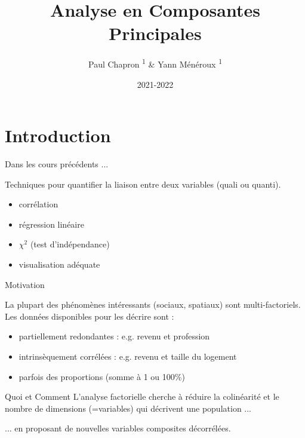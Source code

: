 \documentclass{beamer}
\title{Analyse en Composantes Principales}
\subtitle{}
\date{2021-2022}
\author{Paul Chapron \textsuperscript{1} \& Yann Ménéroux \textsuperscript{1}}
\institute{ \textsuperscript{1}IGN-ENSG-UGE}
\begin{document}
\maketitle	

\section{Introduction} 

\begin{frame}{Dans les cours précédents ... }


Techniques pour quantifier la liaison entre \alert{deux} variables (quali ou quanti). 

\begin{itemize}
\item corrélation
\item régression linéaire
\item $\chi^2$  (test d'indépendance)
\item visualisation adéquate 
\end{itemize}

\end{frame}


\begin{frame}{Motivation}


La plupart des phénomènes intéressants (sociaux, spatiaux) sont \alert{multi-factoriels}. Les données disponibles pour les décrire sont :

\begin{itemize}
	\item partiellement \alert{redondantes}  :   e.g. revenu et profession
	\item intrinsèquement \alert{corrélées} : e.g. revenu et taille du logement
	\item parfois des proportions (somme à 1 ou 100\%)
\end{itemize}
\end{frame}

\begin{frame}{Quoi et Comment}
L'analyse \alert{factorielle}  cherche à réduire la \alert{colinéarité} et le \alert{nombre de dimensions} (=variables) qui décrivent une population ... 

\medskip \medskip

... en proposant de nouvelles variables \alert{composites décorrélées}.
\end{frame}
\end{document}
